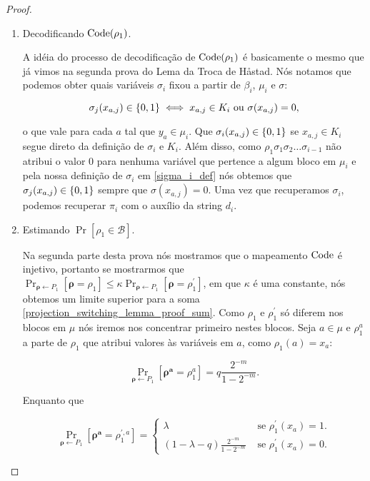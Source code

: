\begin{proof}
\begin{enumerate}
	\item Decodificando $\text{Code}(\rho_{1})$.

	A idéia do processo de decodificação de $\text{Code}(\rho_{1})$ é basicamente o mesmo que já vimos na segunda prova do Lema da Troca de Håstad. Nós notamos que podemos obter quais variáveis $\sigma_{i}$ fixou a partir de $\beta_{i}$, $\mu_{i}$ e $\sigma$:
	
	\begin{equation*}
		\sigma_{j}(x_{a, j}) \in \{0, 1\} \iff x_{a, j} \in K_{i} \text{ ou } \sigma(x_{a, j}) = 0,
	\end{equation*}

	o que vale para cada $a$ tal que $y_{a} \in \mu_{i}$. Que $\sigma_{i}(x_{a, j}) \in \{0, 1\}$ se $x_{a, j} \in K_{i}$ segue direto da definição de $\sigma_{i}$ e $K_{i}$. Além disso, como $\rho_{1}\sigma_{1}\sigma_{2}\dots\sigma_{i - 1}$ não atribui o valor 0 para nenhuma variável que pertence a algum bloco em $\mu_{i}$ e pela nossa definição de $\sigma_{i}$ em \ref{sigma_i_def} nós obtemos que $\sigma_{j}(x_{a, j}) \in \{0, 1\}$ sempre que $\sigma(x_{a, j}) = 0$. Uma vez que recuperamos $\sigma_{i}$, podemos recuperar $\pi_{i}$ com o auxílio da string $d_{i}$.
	
	\item Estimando $\Pr[\rho_{1} \in \mathcal{B}]$.
	
	Na segunda parte desta prova nós mostramos que o mapeamento $\text{Code}$ é injetivo, portanto se mostrarmos que $\Pr_{\boldsymbol{\rho} \leftarrow P_{1}}[\boldsymbol{\rho} = \rho_{1}] \leq \kappa\Pr_{\boldsymbol{\rho} \leftarrow P_{1}}[\boldsymbol{\rho} = \rho_{1}^{\prime}]$, em que $\kappa$ é uma constante, nós obtemos um limite superior para a soma \ref{projection_switching_lemma_proof_sum}. Como $\rho_{1}$ e $\rho_{1}^{\prime}$ só diferem nos blocos em $\mu$ nós iremos nos concentrar primeiro nestes blocos. Seja $a \in \mu$ e $\rho_{1}^{a}$ a parte de $\rho_{1}$ que atribui valores às variáveis em $a$, como $\rho_{1}(a) = x_{a}$:
	
	\begin{equation*}
		\Pr_{\boldsymbol{\rho} \leftarrow P_{1}}[\boldsymbol{\rho^{a}} = \rho_{1}^{a}] = q\frac{2^{-m}}{1 - 2^{-m}}.
	\end{equation*}

	Enquanto que
	
	\begin{equation*}
		\Pr_{\boldsymbol{\rho} \leftarrow P_{1}}[\boldsymbol{\rho^{a}} = \rho_{1}^{\prime, a}] = \begin{cases}
																 	\lambda & \text{ se } \rho_{1}^{\prime}(x_{a}) = 1. \\
																 	(1 - \lambda - q)\frac{2^{-m}}{1 - 2^{-m}} & \text{ se } \rho_{1}^{\prime}(x_{a}) = 0.
		                                                        									 \end{cases}
	\end{equation*}


\end{enumerate}
\end{proof}
